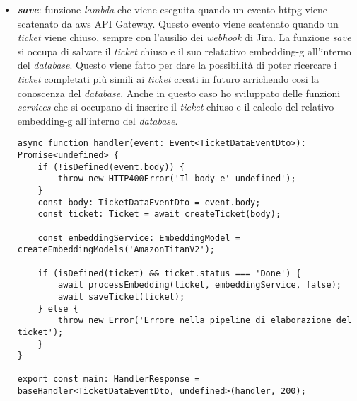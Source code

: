 \begin{itemize}
    \item \textbf{\textit{save}}: funzione \textit{lambda} che viene eseguita quando un evento \gls{httpg} viene scatenato da \gls{aws} API Gateway. Questo evento viene scatenato quando un \textit{ticket} viene chiuso, sempre con l'ausilio dei \textit{webhook} di Jira. La funzione \textit{save} si occupa di salvare il \textit{ticket} chiuso e il suo relatativo \gls{embedding-g} all'interno del \textit{database}. Questo viene fatto per dare la possibilità di poter ricercare i \textit{ticket} completati più simili ai \textit{ticket} creati in futuro arrichendo cosi la conoscenza del \textit{database}. Anche in questo caso 
    ho sviluppato delle funzioni \textit{services} che si occupano di inserire il \textit{ticket} chiuso e il calcolo del relativo \gls{embedding-g} all'interno del \textit{database}.
    \begin{lstlisting}[caption=Funzione \textit{lambda save}, label=lst:saveLambda]
async function handler(event: Event<TicketDataEventDto>): Promise<undefined> {
    if (!isDefined(event.body)) {
        throw new HTTP400Error('Il body e' undefined');
    }
    const body: TicketDataEventDto = event.body;
    const ticket: Ticket = await createTicket(body);
        
    const embeddingService: EmbeddingModel = createEmbeddingModels('AmazonTitanV2');
        
    if (isDefined(ticket) && ticket.status === 'Done') {
        await processEmbedding(ticket, embeddingService, false);
        await saveTicket(ticket);
    } else {
        throw new Error('Errore nella pipeline di elaborazione del ticket');
    }
}
        
export const main: HandlerResponse = baseHandler<TicketDataEventDto, undefined>(handler, 200);
    \end{lstlisting}
\end{itemize}

